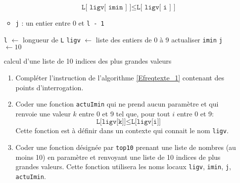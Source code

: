 \begin{enumerate}
\begin{itemize}
  \begin{displaymath}
  \texttt{L[ ligv[ imin ] ]} \leq  \texttt{L[ ligv[ i ] ]}
  \end{displaymath}
  \item \texttt{j} : un entier entre 0 et \texttt{l - 1}
\end{itemize}
\begin{algorithm}
  \texttt{l} $\leftarrow$ longueur de \texttt{L}\;
  \texttt{ligv} $\leftarrow$ liste des entiers de 0 à 9\;
  actualiser  \texttt{imin}\;
  \texttt{j} $\leftarrow 10$\;
  \caption{calcul d'une liste de 10 indices des plus grandes valeurs}
  \label{Efreqtexte_1}
\end{algorithm}
\begin{enumerate}
  \item Compléter l'instruction de l'algorithme \ref{Efreqtexte_1} contenant des points d'interrogation.
  \item Coder une fonction \texttt{actuImin} qui ne prend aucun paramètre et qui renvoie une valeur  $k$ entre 0 et 9 tel que, pour tout $i$ entre 0 et 9:
\begin{displaymath}
  \texttt{L[ligv[k]]} \leq \texttt{L[ligv[i]]} 
\end{displaymath}
Cette fonction est à définir dans un contexte qui connait le nom \texttt{ligv}.
  \item Coder une fonction désignée par \texttt{top10} prenant une liste de nombres (au moins 10) en paramètre et renvoyant une liste de 10 indices de plus grandes valeurs. Cette fonction utilisera les noms locaux \texttt{ligv}, \texttt{imin}, \texttt{j}, \texttt{actuImin}.
\end{enumerate}
\end{enumerate}

